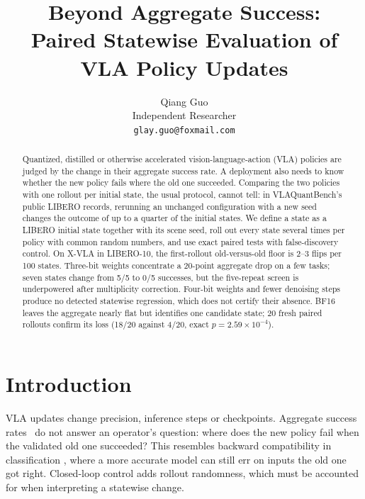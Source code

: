 \documentclass{article}
\title{Beyond Aggregate Success:\\Paired Statewise Evaluation of VLA Policy Updates}
\author{
  Qiang Guo\\
  Independent Researcher\\
  \texttt{glay.guo@foxmail.com}
}
\begin{document}
\maketitle
{}

\begin{abstract}
Quantized, distilled or otherwise accelerated vision-language-action (VLA) policies are judged by
the change in their aggregate success rate. A deployment also needs to know whether the new policy
fails where the old one succeeded. Comparing the two policies with one rollout per initial state,
the usual protocol, cannot tell: in VLAQuantBench's public LIBERO records, rerunning an unchanged
configuration with a new seed changes the outcome of up to a quarter of the initial states. We
define a state as a LIBERO initial state together with its scene seed, roll out every state several
times per policy with common random numbers, and use exact paired tests with
false-discovery control. On X-VLA in LIBERO-10, the first-rollout old-versus-old floor is 2--3
flips per 100 states. Three-bit weights concentrate a 20-point aggregate drop on a few tasks;
seven states change from 5/5 to 0/5 successes, but the five-repeat screen is underpowered after
multiplicity correction. Four-bit weights and fewer denoising steps produce no detected
statewise regression, which does not certify their absence. BF16 leaves the aggregate nearly
flat but identifies one candidate state; 20 fresh paired rollouts confirm its loss
(18/20 against 4/20, exact $p=2.59\times10^{-4}$).
\end{abstract}



\section{Introduction}

VLA updates change precision, inference steps or checkpoints. Aggregate success
rates~\citep{xu2026vlaquantbench} do not answer an operator's question: where does the new
policy fail when the validated old one succeeded? This resembles backward compatibility in classification
\citep{bansal2019updates,srivastava2020compat,yan2021pcr}, where a more accurate model can still
err on inputs the old one got right. Closed-loop control adds rollout randomness, which must
be accounted for when interpreting a statewise change.
\end{document}
